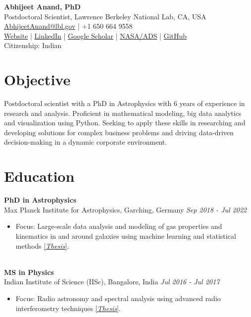 \documentclass[a4paper,10pt]{article}
\begin{document}
\begin{center}
    {\LARGE \textbf{Abhijeet Anand, PhD}} \\
    Postdoctoral Scientist, Lawrence Berkeley National Lab, CA, USA \\
    \href{mailto:AbhijeetAnand@lbl.gov}{AbhijeetAnand@lbl.gov} | +1 650 664 9558 \\
     \href{https://abhi0395.github.io/}{Website}  | \href{https://www.linkedin.com/in/abhijeet-anand-iisc}{LinkedIn} | \href{https://scholar.google.com/citations?hl=en&user=MfOuq1IAAAAJ}{Google Scholar} | \href{https://ui.adsabs.harvard.edu/public-libraries/YPXGQEsNQg-zR9R9YBYFXw}{NASA/ADS} | \href{https://github.com/abhi0395}{GitHub}\\
    Citizenship: Indian\\
\end{center}

\vspace{0.5cm}

\section*{Objective}
Postdoctoral scientist with a PhD in Astrophysics with 6 years of experience in research and analysis. Proficient in mathematical modeling, big data analytics and visualization using Python. Seeking to apply these skills in researching and developing solutions for complex business problems and driving data-driven decision-making in a dynamic corporate environment.

\section*{Education}
\noindent
\textbf{PhD in Astrophysics} \\
Max Planck Institute for Astrophysics, Garching, Germany \hfill \textit{Sep 2018 - Jul 2022} \\
\begin{itemize}[noitemsep, topsep=0pt]
    \item Focus: Large-scale data analysis and modeling of gas properties and kinematics in and around galaxies using machine learning and statistical methods \href{https://edoc.ub.uni-muenchen.de/30337/}{[\textit{Thesis}]}.
\end{itemize}

\noindent\\
\textbf{MS in Physics} \\
Indian Institute of Science (IISc), Bangalore, India \hfill \textit{Jul 2016 - Jul 2017} \\
\begin{itemize}[noitemsep, topsep=0pt]
    \item Focus: Radio astronomy and spectral analysis using advanced radio interferometry techniques \href{https://raw.githubusercontent.com/abhi0395/mycv/main/files/MS_thesis.pdf}{[\textit{Thesis}]}.
\end{itemize}
\end{document}
